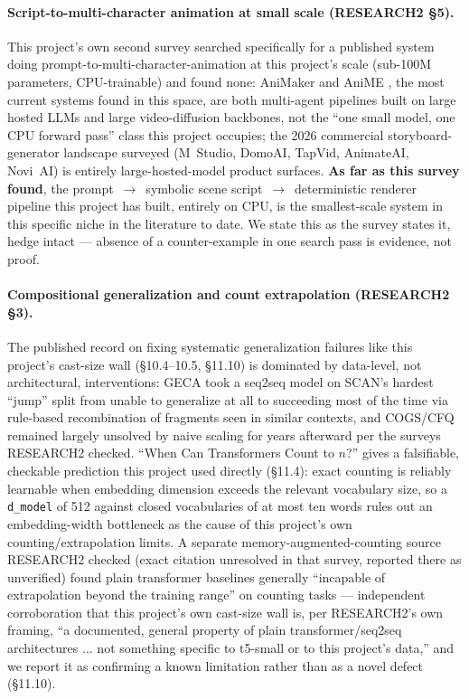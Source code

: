 \documentclass[11pt]{article}
\newcommand{\secsym}{\S}
\begin{document}
\paragraph{Script-to-multi-character animation at small scale (RESEARCH2
\secsym5).} This project's own second survey searched specifically for a
published system doing prompt-to-multi-character-animation at this
project's scale (sub-100M parameters, CPU-trainable) and found none:
AniMaker \cite{animaker2025} and AniME \cite{anime2025}, the most current
systems found in this space, are both multi-agent pipelines built on large
hosted LLMs and large video-diffusion backbones, not the ``one small
model, one CPU forward pass'' class this project occupies; the 2026
commercial storyboard-generator landscape surveyed (M~Studio, DomoAI,
TapVid, AnimateAI, Novi~AI) is entirely large-hosted-model product
surfaces. \textbf{As far as this survey found}, the prompt~$\rightarrow$~symbolic
scene script~$\rightarrow$~deterministic renderer pipeline this project
has built, entirely on CPU, is the smallest-scale system in this specific
niche in the literature to date. We state this as the survey states it,
hedge intact --- absence of a counter-example in one search pass is
evidence, not proof.

\paragraph{Compositional generalization and count extrapolation
(RESEARCH2 \secsym3).} The published record on fixing systematic
generalization failures like this project's cast-size wall (\secsym10.4--10.5,
\secsym11.10) is dominated by data-level, not architectural,
interventions: GECA \cite{andreas2020geca} took a seq2seq model on SCAN's
hardest ``jump'' split from unable to generalize at all to succeeding most
of the time via rule-based recombination of fragments seen in similar
contexts, and COGS/CFQ remained largely unsolved by naive scaling for
years afterward per the surveys RESEARCH2 checked. ``When Can Transformers
Count to $n$?'' \cite{yehudai2024counttransformers} gives a falsifiable,
checkable prediction this project used directly (\secsym11.4): exact
counting is reliably learnable when embedding dimension exceeds the
relevant vocabulary size, so a \texttt{d\_model} of 512 against closed
vocabularies of at most ten words rules out an embedding-width bottleneck
as the cause of this project's own counting/extrapolation limits. A
separate memory-augmented-counting source RESEARCH2 checked (exact
citation unresolved in that survey, reported there as unverified) found
plain transformer baselines generally ``incapable of extrapolation beyond
the training range'' on counting tasks --- independent corroboration that
this project's own cast-size wall is, per RESEARCH2's own framing, ``a
documented, general property of plain transformer/seq2seq architectures
$\ldots$ not something specific to t5-small or to this project's data,''
and we report it as confirming a known limitation rather than as a novel
defect (\secsym11.10).
\end{document}
